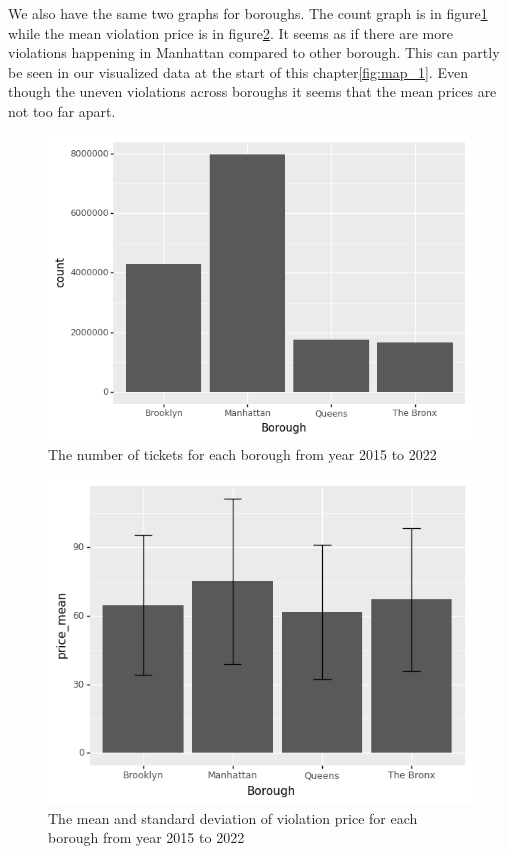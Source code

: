 \documentclass[12pt]{fphw}
\begin{document}
We also have the same two graphs for boroughs. The count graph is in figure\ref{fig:borough_1} while the mean violation price is in figure\ref{fig:borough_2}.
It seems as if there are more violations happening in Manhattan compared to other borough. This can partly be seen in our visualized data at the start of this chapter\ref{fig:map_1}. Even though the uneven violations across boroughs it seems that the mean prices are not too far apart.


\begin{figure}[h!]
  \label{fig:borough_1}
  \includegraphics[width=1\textwidth]{figures2/Borough_count.png}
  \caption{The number of tickets for each borough from year 2015 to 2022}
\end{figure}

\begin{figure}[h!]
  \label{fig:borough_2}
  \includegraphics[width=1\textwidth]{figures2/Borough_price.png}
  \caption{The mean and standard deviation of violation price for each borough from year 2015 to 2022}
\end{figure}
\end{document}
